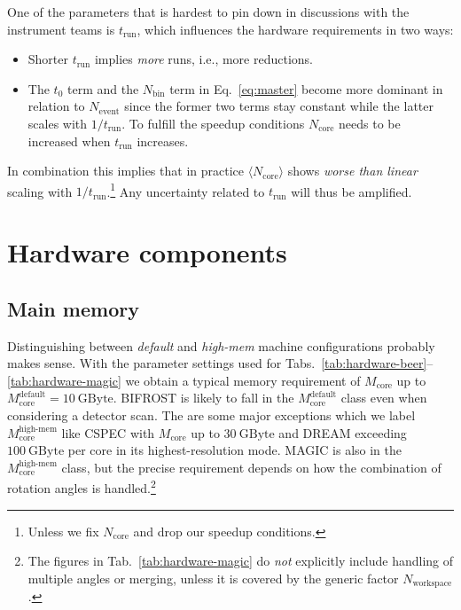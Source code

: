 \documentclass[a4paper,english,numbers=noenddot,bibliography=totoc,chapterprefix=on,DIV=12]{scrartcl}
\newcommand{\Trun}{t_{\text{run}}}
\newcommand{\Nbin}{N_{\text{bin}}}
\newcommand{\Ncore}{N_{\text{core}}}
\newcommand{\Ncoremean}{\langle N_{\text{core}}\rangle}
\newcommand{\Nevent}{N_{\text{event}}}
\newcommand{\Nworkspace}{N_{\text{workspace}}}
\newcommand{\Mcore}{M_{\text{core}}}
\newcommand{\bifrost}{BIFROST\xspace}
\newcommand{\cspec}{CSPEC\xspace}
\newcommand{\dream}{DREAM\xspace}
\newcommand{\magic}{MAGIC\xspace}
\begin{document}
One of the parameters that is hardest to pin down in discussions with the instrument teams is $\Trun$, which influences the hardware requirements in two ways:
\begin{itemize}
  \item Shorter $\Trun$ implies \emph{more} runs, i.e., more reductions.
  \item The $t_0$ term and the $\Nbin$ term in Eq.~\eqref{eq:master} become more dominant in relation to $\Nevent$ since the former two terms stay constant while the latter scales with $1/\Trun$.
    To fulfill the speedup conditions $\Ncore$ needs to be increased when $\Trun$ increases.
\end{itemize}
In combination this implies that in practice $\Ncoremean$ shows \emph{worse than linear} scaling with $1/\Trun$.\footnote{Unless we fix $\Ncore$ and drop our speedup conditions.}
Any uncertainty related to $\Trun$ will thus be amplified.




\section{Hardware components}


\subsection{Main memory}

Distinguishing between \emph{default} and \emph{high-mem} machine configurations probably makes sense.
With the parameter settings used for Tabs.~\ref{tab:hardware-beer}--\ref{tab:hardware-magic} we obtain a typical memory requirement of $\Mcore$ up to $\Mcore^{\text{default}} = 10~\mathrm{GByte}$.
\bifrost is likely to fall in the $\Mcore^{\text{default}}$ class even when considering a detector scan.
The are some major exceptions which we label $\Mcore^{\text{high-mem}}$ like \cspec with $\Mcore$ up to $30~\mathrm{GByte}$ and \dream exceeding $100~\mathrm{GByte}$ per core in its highest-resolution mode.
\magic is also in the $\Mcore^{\text{high-mem}}$ class, but the precise requirement depends on how the combination of rotation angles is handled.\footnote{The figures in Tab.~\ref{tab:hardware-magic} do \emph{not} explicitly include handling of multiple angles or merging, unless it is covered by the generic factor $\Nworkspace$.}
\end{document}
